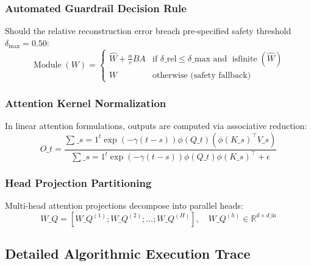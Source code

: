 \subsubsection{Automated Guardrail Decision Rule}
Should the relative reconstruction error breach pre-specified safety threshold $\delta_{\text{max}} = 0.50$:
\[
\operatorname{Module}(W) = \begin{cases} \hat{W} + \frac{\alpha}{r} B A & \text{if } \delta\_{\text{rel}} \le \delta\_{\text{max}} \text{ and } \operatorname{isfinite}(\hat{W}) \\ W & \text{otherwise (safety fallback)} \end{cases}
\]

\subsubsection{Attention Kernel Normalization}
In linear attention formulations, outputs are computed via associative reduction:
\[
O\_t = \frac{\sum\_{s=1}^{t} \exp(-\gamma (t-s)) \phi(Q\_t) (\phi(K\_s)^\top V\_s)}{\sum\_{s=1}^{t} \exp(-\gamma (t-s)) \phi(Q\_t) \phi(K\_s)^\top + \epsilon}
\]

\subsubsection{Head Projection Partitioning}
Multi-head attention projections decompose into parallel heads:
\[
W\_Q = [W\_Q^{(1)}; W\_Q^{(2)}; \dots; W\_Q^{(H)}], \quad W\_Q^{(h)} \in \mathbb{R}^{d \times d\_{\text{in}}}
\]

\subsection{Detailed Algorithmic Execution Trace}

